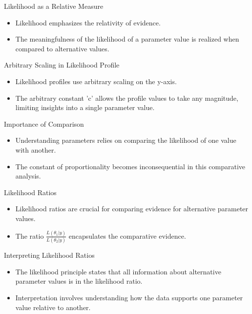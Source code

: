 
\begin{frame}{Likelihood as a Relative Measure}
  \begin{itemize}
    \item Likelihood emphasizes the relativity of evidence.
    \item The meaningfulness of the likelihood of a parameter value is realized when compared to alternative values.
  \end{itemize}
\end{frame}

\begin{frame}{Arbitrary Scaling in Likelihood Profile}
  \begin{itemize}
    \item Likelihood profiles use arbitrary scaling on the y-axis.
    \item The arbitrary constant 'c' allows the profile values to take any magnitude, limiting insights into a single parameter value.
  \end{itemize}
\end{frame}

\begin{frame}{Importance of Comparison}
  \begin{itemize}
    \item Understanding parameters relies on comparing the likelihood of one value with another.
    \item The constant of proportionality becomes inconsequential in this comparative analysis.
  \end{itemize}
\end{frame}

\begin{frame}{Likelihood Ratios}
  \begin{itemize}
    \item Likelihood ratios are crucial for comparing evidence for alternative parameter values.
    \item The ratio \( \frac{L(\theta_1|y)}{L(\theta_2|y)} \) encapsulates the comparative evidence.
  \end{itemize}
\end{frame}

\begin{frame}{Interpreting Likelihood Ratios}
  \begin{itemize}
    \item The likelihood principle states that all information about alternative parameter values is in the likelihood ratio.
    \item Interpretation involves understanding how the data supports one parameter value relative to another.
  \end{itemize}
\end{frame}

